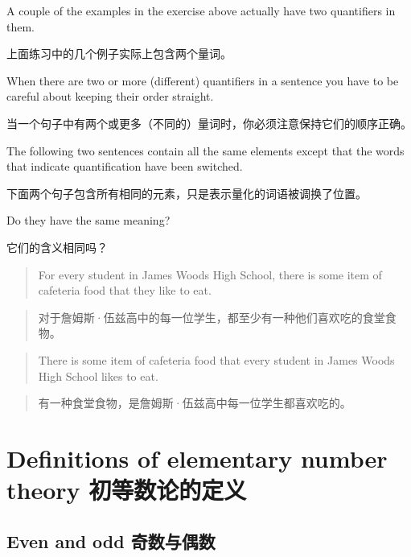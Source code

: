 A couple of the examples in the exercise above actually have two quantifiers
in them.

上面练习中的几个例子实际上包含两个量词。

When there are two or more (different) quantifiers in a sentence
you have to be careful about keeping their order straight.

当一个句子中有两个或更多（不同的）量词时，你必须注意保持它们的顺序正确。

The following 
two sentences contain all the same elements except that the words that 
indicate quantification have been switched.

下面两个句子包含所有相同的元素，只是表示量化的词语被调换了位置。

Do they have the same meaning?

它们的含义相同吗？

\begin{quote}
For every student in James Woods High School, there is some item of
cafeteria food that they like to eat.
\end{quote}

\begin{quote}
对于詹姆斯·伍兹高中的每一位学生，都至少有一种他们喜欢吃的食堂食物。
\end{quote}

\begin{quote}
There is some item of cafeteria food that every student in James Woods 
High School likes to eat.
\end{quote}

\begin{quote}
有一种食堂食物，是詹姆斯·伍兹高中每一位学生都喜欢吃的。
\end{quote}

\newpage





\newpage

\section{Definitions of elementary number theory 初等数论的定义}
\label{sec:num_thry}

\subsection{Even and odd 奇数与偶数}
\label{even_n_odd}

